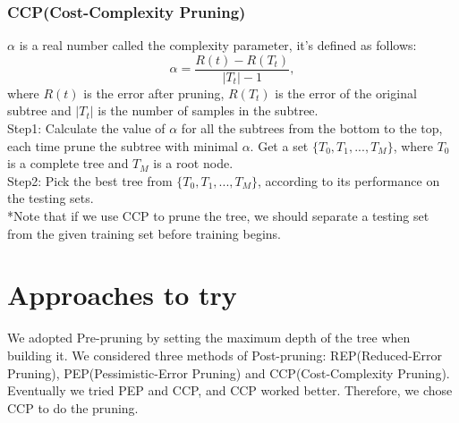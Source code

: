 \documentclass{article}
\begin{document}
\subsubsection{CCP(Cost-Complexity Pruning)}
$\alpha$ is a real number called the complexity parameter, it's defined as follows: 
$$\alpha = \frac{R(t)- R(T_{t})}{|T_{t}|-1},$$ where $R(t)$ is the error after pruning, $R(T_{t})$ is the error of the original subtree and $|T_{t}|$ is the number of samples in the subtree.\\
Step1: Calculate the value of $\alpha$ for all the subtrees from the bottom to the top, each time prune the subtree with minimal $\alpha$. Get a set $\{T_{0}, T_{1},..., T_{M}\}$, where $T_{0}$ is a complete tree and $T_{M}$ is a root node.\\
Step2: Pick the best tree from $\{T_{0}, T_{1},..., T_{M}\}$, according to its performance on the testing sets.\\
*Note that if we use CCP to prune the tree, we should separate a testing set from the given training set before training begins.
\section{Approaches to try}
We adopted Pre-pruning by setting the maximum depth of the tree when building it. We considered three methods of Post-pruning: REP(Reduced-Error Pruning), PEP(Pessimistic-Error Pruning) and CCP(Cost-Complexity Pruning). Eventually we tried PEP and CCP, and CCP worked better. Therefore, we chose CCP to do the pruning.
\end{document}
